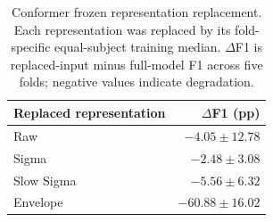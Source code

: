 \begin{table}[!t]
\centering
\caption{Conformer frozen representation replacement. Each representation was replaced by its fold-specific equal-subject training median. $\Delta$F1 is replaced-input minus full-model F1 across five folds; negative values indicate degradation.}
\label{tab:conformer-ablation}
\footnotesize
\begin{tabular}{lr}
\toprule
Replaced representation & $\Delta$F1 (pp) \\ 
\midrule
Raw & $-4.05\pm12.78$ \\ 
Sigma & $-2.48\pm3.08$ \\ 
Slow Sigma & $-5.56\pm6.32$ \\ 
Envelope & $-60.88\pm16.02$ \\ 
\bottomrule
\end{tabular}
\end{table}
